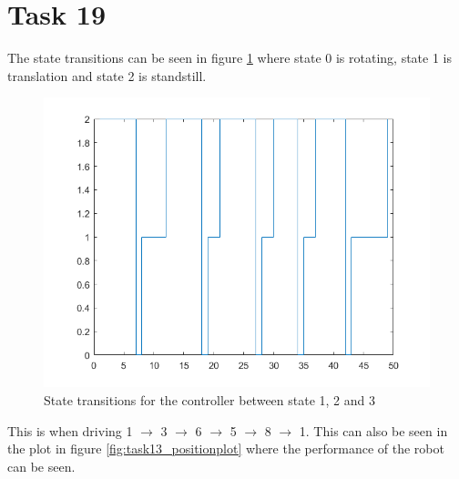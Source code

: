 \documentclass[a4paper,12pt,oneside,onecolumn]{article} %
\begin{document}
\section*{Task 19}
  The state transitions can be seen in figure \ref{fig:task19_trans}
  where state 0 is rotating, state 1 is translation and state 2 is
  standstill. 

\begin{center}
    \begin{figure}[H]
      \centering
      \includegraphics[scale = 0.5]{../matlab/images/task19_trans.png}
      \caption{State transitions for the controller between state 1, 2
      and 3}
      \label{fig:task19_trans}
    \end{figure}
\end{center}

This is when driving 1 $\rightarrow$ 3 $\rightarrow$ 6 $\rightarrow$ 5
$\rightarrow$ 8 $\rightarrow$ 1. This can also be seen in the plot in
figure \ref{fig:task13_positionplot} where the performance of the robot
can be seen.
\end{document}
